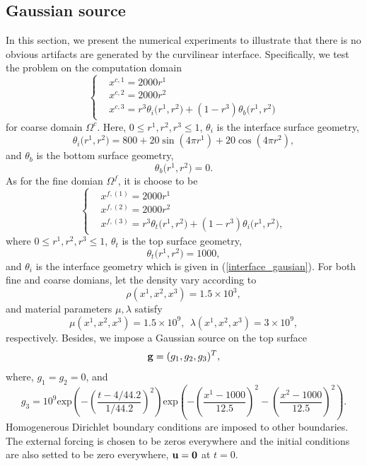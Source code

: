 \subsection{Gaussian source}\label{gaussian_source}
In this section, we present the numerical experiments to illustrate that there is no obvious artifacts are generated by the curvilinear interface. Specifically, we test the problem on the computation domain
\begin{equation}
\left\{
\begin{aligned}
& x^{c,1} = 2000 r^1\\
& x^{c,2} = 2000 r^2\\
& x^{c,3} = r^3 \theta_i\big(r^1,r^2\big) + (1-r^3) \theta_b\big(r^1,r^2\big)
\end{aligned}
\right.
\end{equation}
for coarse domain $\Omega^c$. Here, $0\leq r^1, r^2, r^3\leq 1$, $\theta_i$ is the interface surface geometry,
\begin{equation}\label{interface_gausian}
\theta_i\big(r^1,r^2\big) = 800+20\sin(4\pi r^1)+20\cos(4\pi r^2),
\end{equation}
and 
$\theta_b$ is the bottom surface geometry,
\begin{equation}
\theta_b\big(r^1,r^2\big) = 0.
\end{equation}
As for the fine domian $\Omega^f$, it is choose to be
\begin{equation}
\left\{
\begin{aligned}
& x^{f,(1)} = 2000 r^1\\
& x^{f,(2)} = 2000 r^2\\
& x^{f,(3)} = r^3\theta_t\big(r^1,r^2\big) + (1-r^3)\theta_i\big(r^1,r^2\big),
\end{aligned}
\right.
\end{equation}
where $0\leq r^1, r^2, r^3\leq 1$, $\theta_t$ is the top surface geometry,
\begin{equation}
\theta_t\big(r^1,r^2\big) = 1000,
\end{equation}
and $\theta_i$ is the interface geometry which is given in (\ref{interface_gausian}). For both fine and coarse domians, let the density vary according to
\begin{equation}
\rho(x^1,x^2,x^3) = 1.5\times 10^3,
\end{equation}
and material parameters $\mu, \lambda$ satisfy
\begin{equation}
\mu(x^1,x^2,x^3) = 1.5\times 10^9,\ \ 
\lambda(x^1,x^2,x^3)  = 3\times 10^9,
\end{equation}
respectively. Besides, we impose a Gaussian source on the top surface
\[{\bf g} = (g_1,g_2,g_3)^T ,\]
where, $g_1 = g_2 = 0$, and 
\[g_3 = 10^9 \text{exp}\left(-\left(\frac{t-4/44.2}{1/44.2}\right)^2\right)\text{exp}\left(-\left(\frac{x^1-1000}{12.5}\right)^2-\left(\frac{x^2-1000}{12.5}\right)^2\right).\]
Homogenerous Dirichlet boundary conditions are imposed to other boundaries. The external forcing is chosen to be zeros everywhere and the initial conditions are also setted to be zero everywhere, ${\bf u} = {\bf 0}$ at $t = 0$.


